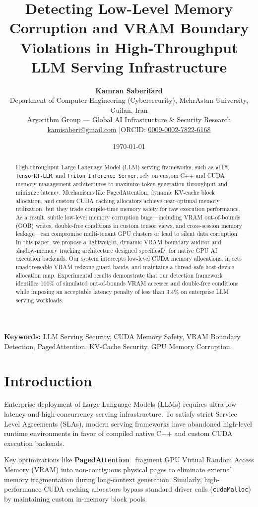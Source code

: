\documentclass[10pt,twocolumn,a4paper]{article}
\title{\textbf{Detecting Low-Level Memory Corruption and VRAM Boundary Violations in High-Throughput LLM Serving Infrastructure}}
\author{
    \textbf{Kamran Saberifard}\\
    Department of Computer Engineering (Cybersecurity), MehrAstan University, Guilan, Iran\\
    Aryorithm Group — Global AI Infrastructure \& Security Research\\
    \href{mailto:kamisaberi@gmail.com}{kamisaberi@gmail.com} \quad|\quad ORCID: \href{https://orcid.org/0009-0002-7822-6168}{0009-0002-7822-6168}
}
\date{\today}
\begin{document}
\maketitle

\begin{abstract}
High-throughput Large Language Model (LLM) serving frameworks, such as \texttt{vLLM}, \texttt{TensorRT-LLM}, and \texttt{Triton Inference Server}, rely on custom C++ and CUDA memory management architectures to maximize token generation throughput and minimize latency. Mechanisms like PagedAttention, dynamic KV-cache block allocation, and custom CUDA caching allocators achieve near-optimal memory utilization, but they trade compile-time memory safety for raw execution performance. As a result, subtle low-level memory corruption bugs—including VRAM out-of-bounds (OOB) writes, double-free conditions in custom tensor views, and cross-session memory leakage—can compromise multi-tenant GPU clusters or lead to silent data corruption. In this paper, we propose a lightweight, dynamic VRAM boundary auditor and shadow-memory tracking architecture designed specifically for native GPU AI execution backends. Our system intercepts low-level CUDA memory allocations, injects unaddressable VRAM redzone guard bands, and maintains a thread-safe host-device allocation map. Experimental results demonstrate that our detection framework identifies 100\% of simulated out-of-bounds VRAM accesses and double-free conditions while imposing an acceptable latency penalty of less than 3.4\% on enterprise LLM serving workloads.
\end{abstract}

\textbf{Keywords:} LLM Serving Security, CUDA Memory Safety, VRAM Boundary Detection, PagedAttention, KV-Cache Security, GPU Memory Corruption.

\section{Introduction}
Enterprise deployment of Large Language Models (LLMs) requires ultra-low-latency and high-concurrency serving infrastructure. To satisfy strict Service Level Agreements (SLAs), modern serving frameworks have abandoned high-level runtime environments in favor of compiled native C++ and custom CUDA execution backends.

Key optimizations like \textbf{PagedAttention}~\cite{vllm} fragment GPU Virtual Random Access Memory (VRAM) into non-contiguous physical pages to eliminate external memory fragmentation during long-context generation. Similarly, high-performance CUDA caching allocators bypass standard driver calls (\texttt{cudaMalloc}) by maintaining custom in-memory block pools.
\end{document}
